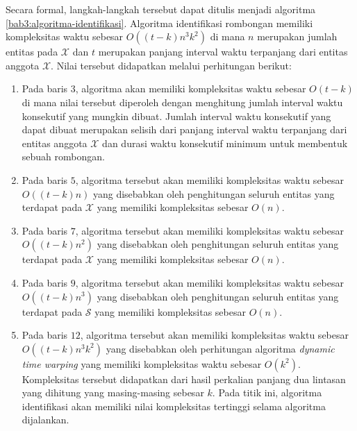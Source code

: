 \documentclass[a4paper,twoside]{article}
\begin{document}
Secara formal, langkah-langkah tersebut dapat ditulis menjadi algoritma \ref{bab3:algoritma-identifikasi}. Algoritma identifikasi rombongan memiliki kompleksitas waktu sebesar $O((t - k)n^3k^2)$ di mana $n$ merupakan jumlah entitas pada $\mathcal{X}$ dan $t$ merupakan panjang interval waktu terpanjang dari entitas anggota $\mathcal{X}$. Nilai tersebut didapatkan melalui perhitungan berikut:

\begin{enumerate}
    \item Pada baris $3$, algoritma akan memiliki kompleksitas waktu sebesar $O(t - k)$ di mana nilai tersebut diperoleh dengan menghitung jumlah interval waktu konsekutif yang mungkin dibuat. Jumlah interval waktu konsekutif yang dapat dibuat merupakan selisih dari panjang interval waktu terpanjang dari entitas anggota $\mathcal{X}$ dan durasi waktu konsekutif minimum untuk membentuk sebuah rombongan.
    \item Pada baris $5$, algoritma tersebut akan memiliki kompleksitas waktu sebesar $O((t - k)n)$ yang disebabkan oleh penghitungan seluruh entitas yang terdapat pada $\mathcal{X}$ yang memiliki kompleksitas sebesar $O(n)$.
    \item Pada baris $7$, algoritma tersebut akan memiliki kompleksitas waktu sebesar $O((t - k)n^2)$ yang disebabkan oleh penghitungan seluruh entitas yang terdapat pada $\mathcal{X}$ yang memiliki kompleksitas sebesar $O(n)$.
    \item Pada baris $9$, algoritma tersebut akan memiliki kompleksitas waktu sebesar $O((t - k)n^3)$ yang disebabkan oleh penghitungan seluruh entitas yang terdapat pada $\mathcal{S}$ yang memiliki kompleksitas sebesar $O(n)$.
    \item Pada baris $12$, algoritma tersebut akan memiliki kompleksitas waktu sebesar $O((t - k)n^3k^2)$ yang disebabkan oleh perhitungan algoritma \textit{dynamic time warping} yang memiliki kompleksitas waktu sebesar $O(k^2)$. Kompleksitas tersebut didapatkan dari hasil perkalian panjang dua lintasan yang dihitung yang masing-masing sebesar $k$. Pada titik ini, algoritma identifikasi akan memiliki nilai kompleksitas tertinggi selama algoritma dijalankan.
\end{enumerate}

\iffalse
\end{document}
